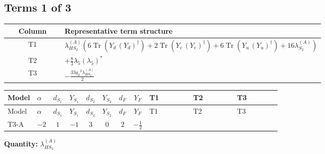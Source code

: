 \documentclass[8pt]{article}
\begin{document}
\begin{landscape}
\subsection*{Terms 1 of 3}
\begin{center}
\begin{tabular}{@{}c >{\raggedright\arraybackslash}p{0.82\linewidth}@{}}
\toprule
Column & Representative term structure \\
\midrule
T1 & \(\displaystyle {\lambda_{HS_2}^{(A)}} (6 \operatorname{Tr}\!\left({Y_d}\,\left({Y_d}\right)^{\dagger}\right)+2 \operatorname{Tr}\!\left({Y_e}\,\left({Y_e}\right)^{\dagger}\right)+6 \operatorname{Tr}\!\left({Y_u}\,\left({Y_u}\right)^{\dagger}\right)+16 {\lambda_{S_2}^{(A)}})\) \\
\midrule
T2 & \(\displaystyle +\frac{8}{3} {\lambda_5} \left({\lambda_5}\right)^{*}\) \\
\midrule
T3 & \(\displaystyle -\frac{33 {g_2}^2 {\lambda_{HS_2}^{(A)}}}{2}\) \\
\midrule
\bottomrule
\end{tabular}
\end{center}
\smallskip
\tiny
\begin{longtable}{@{}llcccccc >{\raggedright\arraybackslash}p{0.21\linewidth} >{\raggedright\arraybackslash}p{0.21\linewidth} >{\raggedright\arraybackslash}p{0.21\linewidth}@{}}
\toprule
Model & $\alpha$ & $d_{S_1}$ & $Y_{S_1}$ & $d_{S_2}$ & $Y_{S_2}$ & $d_F$ & $Y_F$ & T1 & T2 & T3 \\
\midrule
\endfirsthead
\toprule
Model & $\alpha$ & $d_{S_1}$ & $Y_{S_1}$ & $d_{S_2}$ & $Y_{S_2}$ & $d_F$ & $Y_F$ & T1 & T2 & T3 \\
\midrule
\endhead
T3-A & $-2$ & $1$ & $-1$ & $3$ & $0$ & $2$ & $-\frac{1}{2}$ & \scriptsize\adjustbox{max width=\linewidth}{$\begin{gathered} {\lambda_{HS_2}^{(A)}} (6 \operatorname{Tr}\!\left({Y_d}\,\left({Y_d}\right)^{\dagger}\right)+2 \operatorname{Tr}\!\left({Y_e}\,\left({Y_e}\right)^{\dagger}\right)+6 \operatorname{Tr}\!\left({Y_u}\,\left({Y_u}\right)^{\dagger}\right)+16 {\lambda_{S_2}^{(A)}})\end{gathered}$} & \scriptsize\adjustbox{max width=\linewidth}{$\begin{gathered} +\frac{8}{3} {\lambda_5} \left({\lambda_5}\right)^{*}\end{gathered}$} & \scriptsize\adjustbox{max width=\linewidth}{$\begin{gathered} -\frac{33 {g_2}^2 {\lambda_{HS_2}^{(A)}}}{2}\end{gathered}$} \\
\midrule
\bottomrule
\end{longtable}
\clearpage
\noindent\textbf{Quantity: }$\lambda_{HS_2}^{(A)}$\par\smallskip

\end{landscape}
\end{document}
